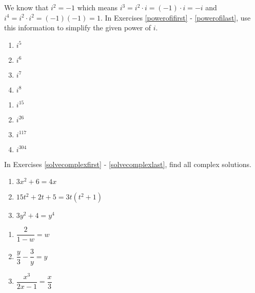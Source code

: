 \documentclass[11pt]{article}
\theoremstyle{definition}  %
\newcounter{HW}
\begin{document}
We know that $i^{2} = -1$ which means $i^{3} = i^{2} \cdot i = (-1) \cdot i = -i$ and $i^{4} = i^{2} \cdot i^{2} = (-1)(-1) = 1$. In Exercises \ref{powerofifirst} - \ref{powerofilast}, use this information to simplify the given power of $i$.

\begin{multicols}{4}
\begin{enumerate}
\setcounter{enumi}{\value{HW}}

\item $i^{5}$ \label{powerofifirst}
\item $i ^{6}$
\item $i^{7}$
\item $i^{8}$

\setcounter{HW}{\value{enumi}}
\end{enumerate}
\end{multicols}

\begin{multicols}{4}
\begin{enumerate}
\setcounter{enumi}{\value{HW}}

\item $i^{15}$
\item $i^{26}$
\item $i^{117}$
\item $i^{304}$ \label{powerofilast}

\setcounter{HW}{\value{enumi}}
\end{enumerate}
\end{multicols}

In Exercises \ref{solvecomplexfirst} - \ref{solvecomplexlast}, find all complex solutions.

\begin{multicols}{3}
\begin{enumerate}
\setcounter{enumi}{\value{HW}}

\item $3x^2 + 6 = 4x$ \label{solvecomplexfirst}
\item  $15t^2+2t+5= 3t(t^2+1)$
\item  $3y^2 + 4 = y^4$

\setcounter{HW}{\value{enumi}}
\end{enumerate}
\end{multicols}
\begin{multicols}{3}
\begin{enumerate}
\setcounter{enumi}{\value{HW}}

\item $\dfrac{2}{1-w}= w$ 
\item $\dfrac{y}{3} - \dfrac{3}{y} = y$ 
\item $\dfrac{x^3}{2x-1} = \dfrac{x}{3}$ 

\setcounter{HW}{\value{enumi}}
\end{enumerate}
\end{multicols}
\end{document}
